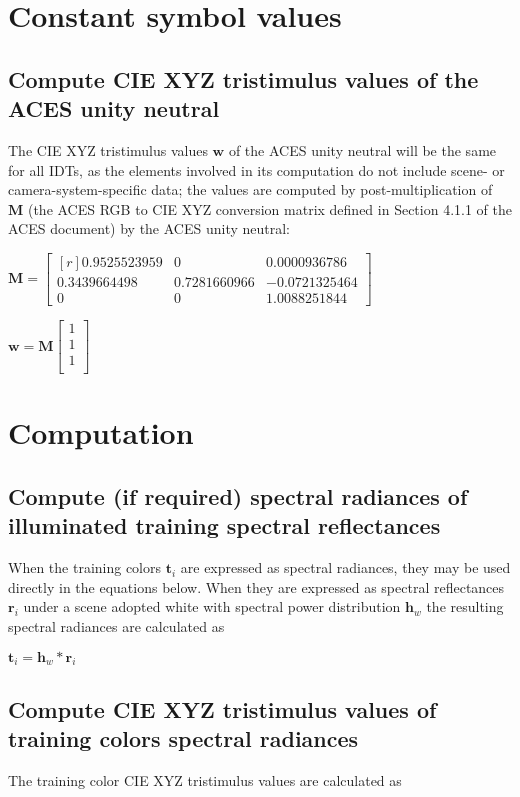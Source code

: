 \section{Constant symbol values}
\subsection{Compute CIE XYZ tristimulus values of the ACES unity neutral}
The CIE XYZ tristimulus values $\mathbf{w}$ of the ACES unity neutral will be the same for all IDTs, as the elements involved in its computation do not include scene- or camera-system-specific data; the values are computed by post-multiplication of $\mathbf{M}$ (the ACES RGB to CIE XYZ conversion matrix defined in Section 4.1.1 of the ACES document) by the ACES unity neutral:

$\mathbf{M} =
    \begin{bmatrix*}[r]
		0.9525523959 & 0 & 0.0000936786 \\
		0.3439664498 & 0.7281660966 & -0.0721325464 \\
		0 & 0 & 1.0088251844
    \end{bmatrix*}$

$\mathbf{w} =\mathbf{M}\begin{bmatrix} 1 \\ 1 \\ 1 \\ \end{bmatrix}$

\section{Computation}
\subsection{Compute (if required) spectral radiances of illuminated training spectral reflectances}
\label{sec:compstart}
When the training colors $\mathbf{t}_i$ are expressed as spectral radiances, they may be used directly in the equations below. When they are expressed as spectral reflectances $\mathbf{r}_i$ under a scene adopted white with spectral power distribution $\mathbf{h}_w$ the resulting spectral radiances are calculated as 

$\mathbf{t}_i = \mathbf{h}_w*\mathbf{r}_i$

\subsection{Compute CIE XYZ tristimulus values of training colors spectral radiances}
The training color CIE XYZ tristimulus values are calculated as 

